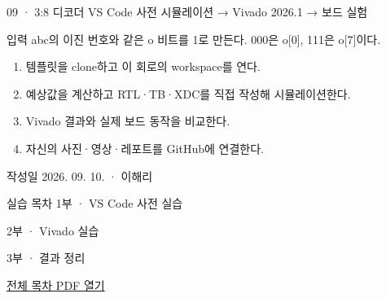 
\renewcommand{\labonehome}{\hyperlink{modern-09-contents}{\contentsbutton}}
\renewcommand{\legacySource}[1]{}
\providecommand{\terminalbox}[1]{\par\vspace{0.15cm}{\setlength{\fboxsep}{7pt}\colorbox{black}{\parbox{\dimexpr\textwidth-14pt\relax}{\color{white}\ttfamily\fontsize{7}{9}\selectfont #1}}}\par\vspace{0.15cm}}

\begingroup
\renewcommand{\small}{\fontsize{9}{11}\selectfont}
\begin{frame}{09 · 3:8 디코더}\relax
\small
VS Code 사전 시뮬레이션 → Vivado 2026.1 → 보드 실험\par\vspace{0.22cm}입력 abc의 이진 번호와 같은 o 비트를 1로 만든다. 000은 o[0], 111은 o[7]이다.\par\begin{enumerate}\setlength{\itemsep}{0.22cm}
\item 템플릿을 clone하고 이 회로의 workspace를 연다.
\item 예상값을 계산하고 RTL·TB·XDC를 직접 작성해 시뮬레이션한다.
\item Vivado 결과와 실제 보드 동작을 비교한다.
\item 자신의 사진·영상·레포트를 GitHub에 연결한다.
\end{enumerate}
작성일 2026. 09. 10. · 이해리\par
\end{frame}

\begin{frame}[label=modern-09-contents]{실습 목차}\relax
\small
1부 · VS Code 사전 실습\par{}\par\vspace{0.2cm}
\par\vspace{0.4cm}
2부 · Vivado 실습\par{}\par\vspace{0.4cm}
3부 · 결과 정리\par{}\par\vspace{0.35cm}
\href{04.LAB1_00_CONTENTS.pdf}{전체 목차 PDF 열기}
\end{frame}

